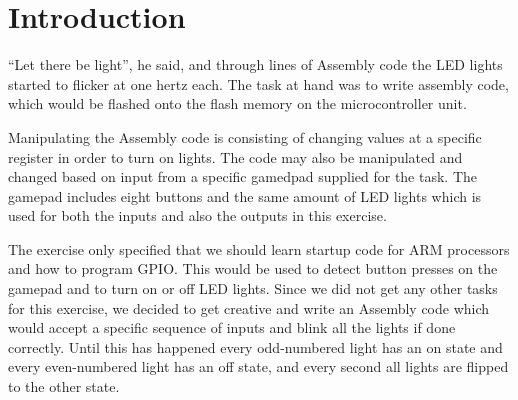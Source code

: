 \chapter{Introduction}

``Let there be light'', he said, and through lines of Assembly code the LED
lights started to flicker at one hertz each. The task at hand was to write
assembly code, which would be flashed onto the flash memory on the
microcontroller unit.

Manipulating the Assembly code is consisting of changing values at a specific
register in order to turn on lights. The code may also be manipulated and
changed based on input from a specific gamedpad supplied for the task. The
gamepad includes eight buttons and the same amount of LED lights which is used
for both the inputs and also the outputs in this exercise.

The exercise only specified that we should learn startup code for ARM
processors and how to program GPIO. This would be used to detect button presses
on the gamepad and to turn on or off LED lights. Since we did not get any other
tasks for this exercise, we decided to get creative and write an Assembly code
which would accept a specific sequence of inputs and blink all the lights if
done correctly. Until this has happened every odd-numbered light has an on
state and every even-numbered light has an off state, and every second all
lights are flipped to the other state.
